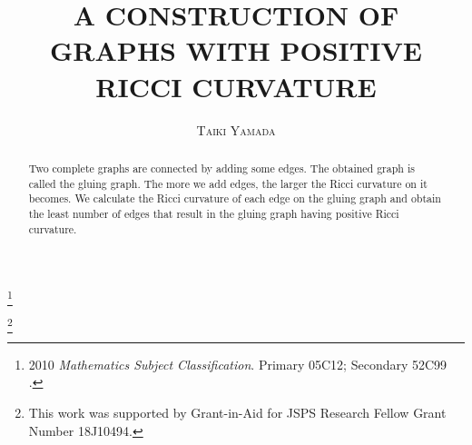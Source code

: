 \documentclass[leqno,12pt]{amsart} %
\theoremstyle{plain} %
\theoremstyle{definition} %
\begin{document}
\title{\uppercase{A construction of graphs with positive Ricci curvature}} %
%
\author{\textsc{Taiki Yamada}}
\date{} %
%


\footnote{ %
2010 \textit{Mathematics Subject Classification}.
Primary 05C12; Secondary 52C99 .
}


\footnote{
This work was supported by Grant-in-Aid for JSPS Research Fellow Grant Number 18J10494.
}

\address{ 
Mathematical Institute in Tohoku University \endgraf
Sendai 980-8578 \endgraf
Japan
}



\maketitle

\begin{abstract}
Two complete graphs are connected by adding some edges. The obtained graph is called the gluing graph. The more we add edges, the larger the Ricci curvature on it becomes. We calculate the Ricci curvature of each edge on the gluing graph and obtain the least number of edges that result in the gluing graph having positive Ricci curvature.
\end{abstract}
\end{document}
